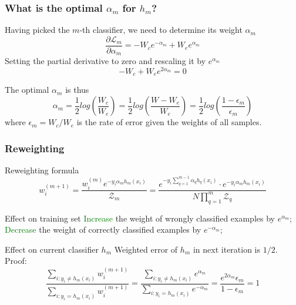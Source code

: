 \documentclass{beamer}
\begin{document}
\begin{CJK*}{UTF8}{gbsn}
\begin{frame}\frametitle{What is the optimal $\alpha_m$ for $h_m$?}
Having picked the $m$-th classifier, we need to determine its weight $\alpha_m$
\begin{equation}
\frac{\partial\mathcal{L}_m}{\partial\alpha_m}=-W_ce^{-\alpha_m}+W_ee^{\alpha_m}
\end{equation}
Setting the partial derivative to zero and rescaling it by $e^{\alpha_m}$
\begin{equation}
-W_c+W_ee^{2\alpha_m}=0
\end{equation}
\begin{exampleblock}{The optimal $\alpha_m$ is thus}
\begin{equation}
\alpha_m=\frac{1}{2}log(\frac{W_c}{W_e})=\frac{1}{2}log(\frac{W-W_e}{W_e})=\frac{1}{2}log(\frac{1-\epsilon_m}{\epsilon_m})
\end{equation}
where $\epsilon_m=W_c/W_e$ is the rate of error given the weights of all samples.
\end{exampleblock}
\end{frame}

\begin{frame}\frametitle{Reweighting}
Reweighting formula
\begin{equation}
w_i^{(m+1)}=\frac{w_i^{(m)}e^{-y_i\alpha_mh_m(x_i)}}{\mathcal{Z}_m}=\frac{e^{-y_i\sum_{q=1}^{m-1}\alpha_qh_q(x_i)}\cdot e^{-y_i\alpha_mh_m(x_i)}}{N\prod_{q=1}^m\mathcal{Z}_q}
\end{equation}
\begin{exampleblock}{Effect on training set}
\textcolor{green}{Increase} the weight of wrongly classified examples by $e^{\alpha_m}$;\\
\textcolor{green}{Decrease} the weight of correctly classified examples by $e^{-\alpha_m}$;
\end{exampleblock}
\begin{exampleblock}{Effect on current classifier $h_m$}
Weighted error of $h_m$ in next iteration is $1/2$. Proof:
\begin{equation}
\frac{\sum_{i:y_i\neq h_m(x_i)}w_i^{(m+1)}}{\sum_{i:y_i=h_m(x_i)}w_i^{(m+1)}}=\frac{\sum_{i:y_i\neq h_m(x_i)}e^{\alpha_m}}{\sum_{i:y_i=h_m(x_i)}e^{-\alpha_m}}=\frac{e^{2\alpha_m}\epsilon_m}{1-\epsilon_m}=1
\end{equation}
\end{exampleblock}
\end{frame}



\end{CJK*}
\end{document}

